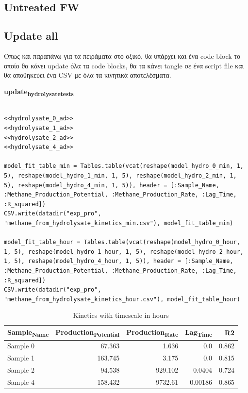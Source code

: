\documentclass[11pt]{article}
\begin{document}
\subsection{Untreated FW}
\label{sec:orgfdd3c0d}

\subsection{Update all}
\label{sec:org836bfb2}
Όπως και παραπάνω για τα πειράματα στο οξικό, θα υπάρχει και ένα code block το οποίο θα κάνει update όλα τα code blocks, θα τα κάνει tangle σε ένα script file και θα αποθηκεύει ένα CSV με όλα τα κινητικά αποτελέσματα.

\textbf{update\textsubscript{hydrolysate}\textsubscript{tests}}
\begin{verbatim}

<<hydrolysate_0_ad>>
<<hydrolysate_1_ad>>
<<hydrolysate_2_ad>>
<<hydrolysate_4_ad>>

model_fit_table_min = Tables.table(vcat(reshape(model_hydro_0_min, 1, 5), reshape(model_hydro_1_min, 1, 5), reshape(model_hydro_2_min, 1, 5), reshape(model_hydro_4_min, 1, 5)), header = [:Sample_Name, :Methane_Production_Potential, :Methane_Production_Rate, :Lag_Time, :R_squared])
CSV.write(datadir("exp_pro", "methane_from_hydrolysate_kinetics_min.csv"), model_fit_table_min)

model_fit_table_hour = Tables.table(vcat(reshape(model_hydro_0_hour, 1, 5), reshape(model_hydro_1_hour, 1, 5), reshape(model_hydro_2_hour, 1, 5), reshape(model_hydro_4_hour, 1, 5)), header = [:Sample_Name, :Methane_Production_Potential, :Methane_Production_Rate, :Lag_Time, :R_squared])
CSV.write(datadir("exp_pro", "methane_from_hydrolysate_kinetics_hour.csv"), model_fit_table_hour)
\end{verbatim}

\begin{table}[htbp]
\caption{Kinetics with timescale in hours}
\centering
\begin{tabular}{lrrrr}
Sample\textsubscript{Name} & Production\textsubscript{Potential} & Production\textsubscript{Rate} & Lag\textsubscript{Time} & R2\\[0pt]
\hline
Sample 0 & 67.363 & 1.636 & 0.0 & 0.862\\[0pt]
Sample 1 & 163.745 & 3.175 & 0.0 & 0.815\\[0pt]
Sample 2 & 94.538 & 929.102 & 0.0404 & 0.724\\[0pt]
Sample 4 & 158.432 & 9732.61 & 0.00186 & 0.865\\[0pt]
\end{tabular}
\end{table}
\end{document}
